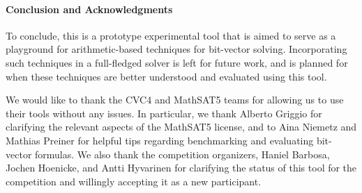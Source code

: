 \documentclass{easychair}
\newcommand{\msat}{MathSAT5\xspace}
\newcommand{\cvcfour}{CVC4\xspace}
\begin{document}
\paragraph{Conclusion and Acknowledgments}
To conclude, this is a prototype experimental tool that is aimed
to serve as a playground for arithmetic-based techniques
for bit-vector solving.
Incorporating such techniques in a full-fledged solver is left for future work,
and is planned for when these techniques are better
understood and evaluated using this tool.

We would like to thank the \cvcfour and \msat teams for allowing us
to use their tools without any issues.
In particular, we thank Alberto Griggio for clarifying
the relevant aspects of the \msat license,
and to Aina Niemetz and Mathias Preiner for helpful tips
regarding benchmarking and evaluating bit-vector formulas.
We also thank the competition organizers,
Haniel Barbosa, Jochen Hoenicke, and
Antti Hyvarinen for clarifying the status of this tool for the competition and willingly accepting it as a new participant.



  
  
\end{document}
